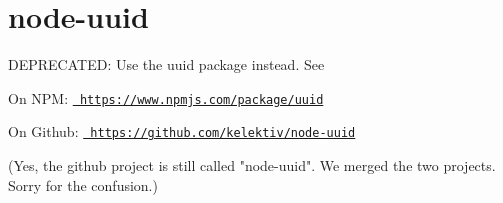 \chapter{node-\/uuid}
\hypertarget{md__c_1_2_users_2_s_t_r_i_d_e_r_2source_2repos_2_ainslie_a_p_i_2wwwroot_2lib_2jquery-ui_2node__mc62b514a1f5a38fe50835a2bcb37aad6}{}\label{md__c_1_2_users_2_s_t_r_i_d_e_r_2source_2repos_2_ainslie_a_p_i_2wwwroot_2lib_2jquery-ui_2node__mc62b514a1f5a38fe50835a2bcb37aad6}
\label{md__c_1_2_users_2_s_t_r_i_d_e_r_2source_2repos_2_ainslie_a_p_i_2wwwroot_2lib_2jquery-ui_2node__mc62b514a1f5a38fe50835a2bcb37aad6_autotoc_md3829}%
%
 DEPRECATED\+: Use the {\ttfamily uuid} package instead. See


\begin{DoxyItemize}
\item On NPM\+: \href{https://www.npmjs.com/package/uuid}{\texttt{ https\+://www.\+npmjs.\+com/package/uuid}}
\item On Github\+: \href{https://github.com/kelektiv/node-uuid}{\texttt{ https\+://github.\+com/kelektiv/node-\/uuid}}
\end{DoxyItemize}

(Yes, the github project is still called "{}node-\/uuid"{}. We merged the two projects. Sorry for the confusion.) 
